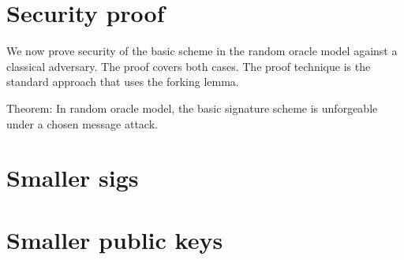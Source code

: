 \documentclass{llncs}
\begin{document}
\section{Security proof}


We now prove security of the basic scheme in the random oracle model against a classical adversary. The proof covers both cases.
The proof technique is the standard approach that uses the forking lemma.


Theorem: In random oracle model, the basic signature scheme is unforgeable under a chosen message attack.



\section{Smaller sigs}

\section{Smaller public keys}




\end{document}
